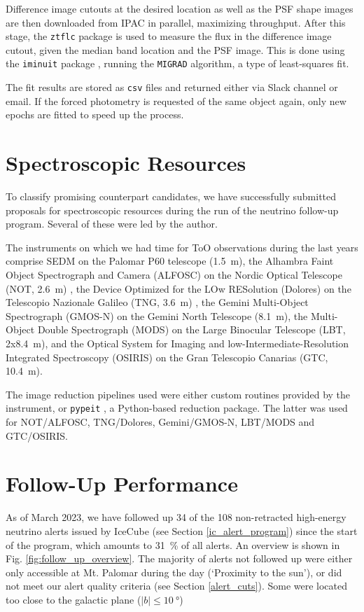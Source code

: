 \documentclass[
    a4paper, %
    fontsize=10pt, %
    twoside=true, %
    numbers=noenddot, %
    fontmethod=tex,
]{kaobook}
\begin{document}
Difference image cutouts at the desired location as well as the PSF shape images are then downloaded from IPAC in parallel, maximizing throughput. After this stage, the \texttt{ztflc} package is used to measure the flux in the difference image cutout, given the median band location and the PSF image. This is done using the \texttt{iminuit} package , running the \texttt{MIGRAD}  algorithm, a type of least-squares fit.

The fit results are stored as \texttt{csv} files and returned either via Slack channel or email. If the forced photometry is requested of the same object again, only new epochs are fitted to speed up the process.

\section{Spectroscopic Resources}
To classify promising counterpart candidates, we have successfully submitted proposals for spectroscopic resources during the run of the neutrino follow-up program. Several of these were led by the author.

The instruments on which we had time for ToO observations during the last years comprise SEDM on the Palomar P60 telescope (\SI{1.5}{\meter}), the Alhambra Faint Object Spectrograph and Camera (ALFOSC) on the Nordic Optical Telescope (NOT, \SI{2.6}{\meter}) , the Device Optimized for the LOw RESolution (Dolores) on the Telescopio Nazionale Galileo (TNG, \SI{3.6}{\meter}) , the Gemini Multi-Object Spectrograph (GMOS-N)  on the Gemini North Telescope (\SI{8.1}{\meter}), the Multi-Object Double Spectrograph (MODS)  on the Large Binocular Telescope (LBT, 2x\SI{8.4}{\meter}), and the Optical System for Imaging and low-Intermediate-Resolution Integrated Spectroscopy (OSIRIS)  on the Gran Telescopio Canarias (GTC, \SI{10.4}{\meter}).

The image reduction pipelines used were either custom routines provided by the instrument, or \texttt{pypeit} , a Python-based reduction package. The latter was used for NOT/ALFOSC, TNG/Dolores, Gemini/GMOS-N, LBT/MODS and GTC/OSIRIS.

\section{Follow-Up Performance}
As of March 2023, we have followed up 34 of the 108 non-retracted high-energy neutrino alerts issued by IceCube (see Section \ref{ic_alert_program}) since the start of the program, which amounts to \SI{31}{\percent} of all alerts. An overview is shown in Fig. \ref{fig:follow_up_overview}. The majority of alerts not followed up were either only accessible at Mt. Palomar during the day (`Proximity to the sun'), or did not meet our alert quality criteria (see Section \ref{alert_cuts}). Some were located too close to the galactic plane ($|b|\leq\SI{10}{\degree}$)
\end{document}
